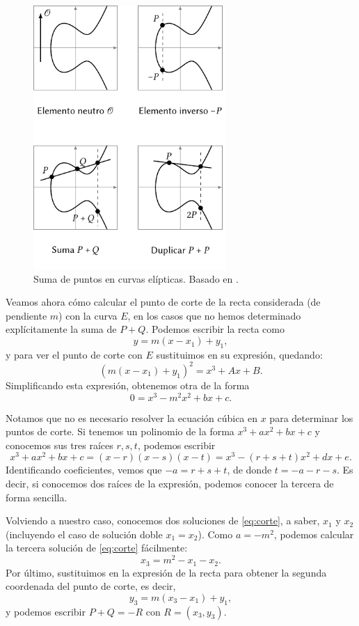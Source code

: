 \documentclass[
  a4paper,
  12pt,
  spanish,
]{scrartcl}
\begin{document}
\begin{figure}[h]
  \centering
  \includegraphics[width=0.65\textwidth]{img/operaciones-curvas}
  \caption{Suma de puntos en curvas elípticas. Basado en  \parencite{eichlseder_elliptic_2016}.}
  \label{fig:operaciones-curvas}
\end{figure}

Veamos ahora cómo calcular el punto de corte de la recta considerada (de pendiente $m$) con la curva $E$, en los casos que no hemos determinado explícitamente la suma de $P+Q$. Podemos escribir la recta como \[ y = m(x - x_1) + y_1, \] y para ver el punto de corte con $E$ sustituimos en su expresión, quedando: \[ (m(x - x_1) + y_1)^2 = x^3 + Ax + B. \] Simplificando esta expresión, obtenemos otra de la forma
\begin{equation}
    \label{eq:corte}
	0 = x^3 - m^2x^2 + bx + c.
\end{equation}

    Notamos que no es necesario resolver la ecuación cúbica en $x$ para determinar los puntos de corte. Si tenemos un polinomio de la forma $x^3 + ax^2 + bx + c$ y conocemos sus tres raíces $r,s,t$, podemos escribir \[ x^3 + ax^2 + bx + c = (x-r)(x-s)(x-t) = x^3 - (r+s+t)x^2 + dx + e. \] Identificando coeficientes, vemos que $-a = r + s + t$, de donde $t = -a -r -s$. Es decir, si conocemos dos raíces de la expresión, podemos conocer la tercera de forma sencilla.

    Volviendo a nuestro caso, conocemos dos soluciones de \eqref{eq:corte}, a saber, $x_1$ y $x_2$ (incluyendo el caso de solución doble $x_1=x_2$). Como $a = -m^2$, podemos calcular la tercera solución de \eqref{eq:corte} fácilmente: \[ x_3 = m^2 - x_1 - x_2. \] Por último, sustituimos en la expresión de la recta para obtener la segunda coordenada del punto de corte, es decir, \[y_3 = m(x_3 - x_1) + y_1, \] y podemos escribir $P+Q = -R$ con $R=(x_3, y_3)$.
\end{document}
